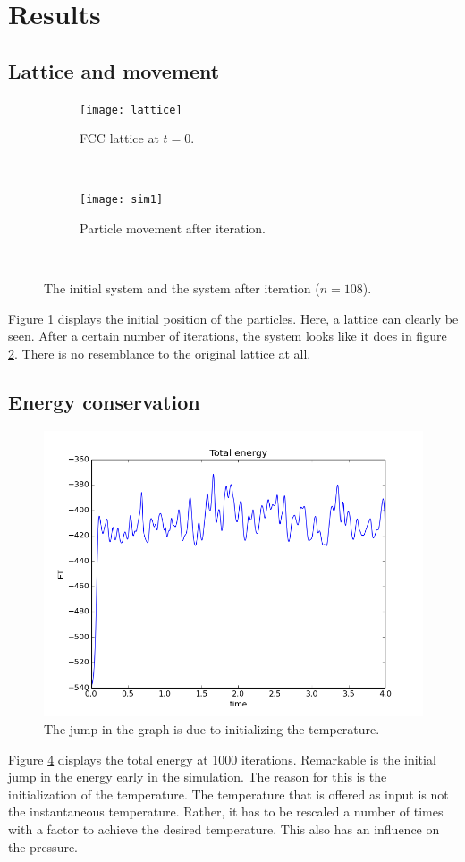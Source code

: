 \documentclass[10pt,a4paper,notitlepage]{article}
\begin{document}
\section{Results}\label{sec:res}
\subsection{Lattice and movement}
\begin{figure}[h]
        \centering
        \begin{subfigure}{0.45\textwidth}
                \texttt{[image: lattice]}
                \caption{FCC lattice at $t=0$.}
                \label{fig:lattice}
        \end{subfigure}%
        ~ 
        \begin{subfigure}{0.45\textwidth}
                \texttt{[image: sim1]}
                \caption{Particle movement after iteration.}
                \label{fig:sim1}
        \end{subfigure}
        ~ 
        \caption{The initial system and the system after iteration ($n=108$).}\label{fig:latsim}
\end{figure}
Figure \ref{fig:lattice} displays the initial position of the particles. Here, a lattice can clearly be seen. After a certain number of iterations, the system looks like it does in figure \ref{fig:sim1}. There is no resemblance to the original lattice at all.
\newpage
\subsection{Energy conservation}

\begin{figure}[h!]
\centering
\includegraphics[width=0.7\linewidth]{et_1000}
\caption{The jump in the graph is due to initializing the temperature.}
\label{fig:et_1000}
\end{figure}
Figure \ref{fig:et_1000} displays the total energy at 1000 iterations. Remarkable is the initial jump in the energy early in the simulation. The reason for this is the initialization of the temperature. The temperature that is offered as input is not the instantaneous temperature. Rather, it has to be rescaled a number of times with a factor to achieve the desired temperature. This also has an influence on the pressure.
\end{document}
